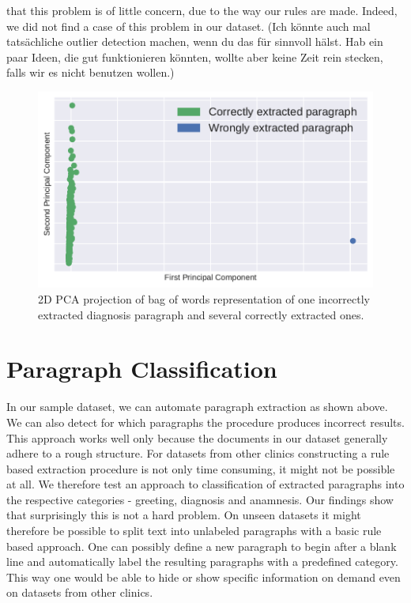 that this problem is of little concern, due to the way our rules are made.
Indeed, we did not find a case
of this problem in our dataset. (Ich könnte auch mal tatsächliche outlier detection machen, wenn du das für sinnvoll hälst. Hab ein paar Ideen, die gut funktionieren könnten, wollte aber keine Zeit rein stecken, falls wir es nicht benutzen wollen.)
\begin{figure}
	\includegraphics[width=\linewidth]{figures/bow_find_odd}
	\caption{2D PCA projection of bag of words representation of one incorrectly extracted diagnosis paragraph and several correctly extracted ones.}
	\label{fig:bow_find_odd}
\end{figure}




\section{Paragraph Classification}
In our sample dataset, we can automate paragraph extraction as shown above. We can also detect for which paragraphs the procedure produces incorrect results. This approach works well only because the documents in our dataset generally adhere to a rough structure. For datasets from other clinics constructing a rule based extraction procedure is not only time consuming, it might not be possible at all. We therefore test an approach to classification of extracted paragraphs into the respective categories - greeting, diagnosis and anamnesis. Our findings show that surprisingly this is not a hard problem. On unseen datasets it might therefore be possible to split text into unlabeled paragraphs with a basic rule based approach. One can possibly define a new paragraph to begin after a blank line and automatically label the resulting paragraphs with a predefined category. This way one would be able to hide or show specific information on demand even on datasets from other clinics.

